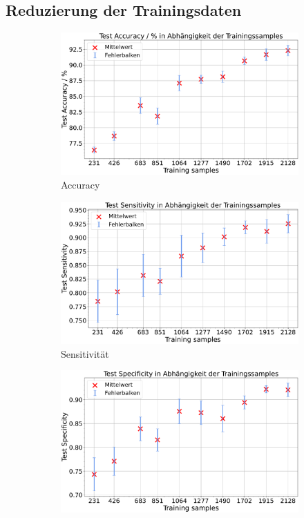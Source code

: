 \subsection{Reduzierung der Trainingsdaten}

\begin{figure}[htbp]
  \centering
  \begin{subfigure}[b]{0.48\textwidth}
    \centering
    \includegraphics[width=\textwidth]{plots/3-Messungen-Gli-Men_Accuracy_mean.pdf}
    \caption{Accuracy}
    \label{fig:gli-men-acc}
  \end{subfigure}
  \begin{subfigure}[b]{0.48\textwidth}
    \centering
    \includegraphics[width=\textwidth]{plots/3-Messungen-Gli-Men_Sensitivity_mean.pdf}
    \caption{Sensitivität}
    \label{fig:gli-men-sens}
  \end{subfigure}
  \begin{subfigure}[b]{0.48\textwidth}
    \centering
    \includegraphics[width=\textwidth]{plots/3-Messungen-Gli-Men_Specificity_mean.pdf}

\end{subfigure}
\end{figure}
